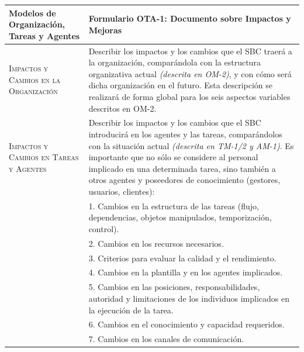 \documentclass[12pt,a4paper,twoside,spanish]{article}      %
\begin{document}
            \vspace*{1cm}
                    
            \begin{table}[H]
                \scriptsize
                \begin{tabularx}{\textwidth}{|p{4cm}|X|} \hline
                    \textbf{Modelos de Organización, Tareas y Agentes} & \textbf{Formulario OTA-1: Documento sobre Impactos y Mejoras}\\ \hline\hline 
                    
                    \textsc{Impactos y Cambios en la Organización} & Describir los impactos y los cambios que el SBC traerá a la organización, comparándola con la estructura organizativa actual \emph{(descrita en OM-2)}, y con cómo será dicha organización en el futuro. Esta descripción se realizará de forma global para los seis aspectos variables descritos en OM-2. \\ \hline
                    
                    \textsc{Impactos y Cambios en Tareas y Agentes} & Describir los impactos y los cambios que el SBC introducirá en los agentes y las tareas, comparándolos con la situación actual \emph{(descrita en TM-1/2 y AM-1)}. Es importante que no sólo se considere al personal implicado en una determinada tarea, sino también a otros agentes y poseedores de conocimiento (gestores, usuarios, clientes): \\
                    
                    & 1. Cambios en la estructura de las tareas (flujo, dependencias, objetos manipulados, temporización, control). \\
                    & 2. Cambios en los recursos necesarios. \\
                    & 3. Criterios para evaluar la calidad y el rendimiento.\\
                    & 4. Cambios en la plantilla y en los agentes implicados.\\
                    & 5. Cambios en las posiciones, responsabilidades, autoridad y limitaciones de los
                    individuos implicados en la ejecución de la tarea.\\
                    & 6. Cambios en el conocimiento y capacidad requeridos.\\
                    & 7. Cambios en los canales de comunicación.\\ \hline
                    

\end{tabularx}
\end{table}
\end{document}
